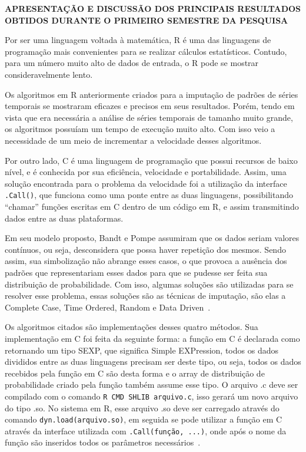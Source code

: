 \documentclass{article}
\begin{document}
\newpage
\begin{center}
\textbf{\large{APRESENTAÇÃO E DISCUSSÃO DOS PRINCIPAIS RESULTADOS OBTIDOS DURANTE O PRIMEIRO SEMESTRE DA PESQUISA}}

\hrulefill 

\end{center}
    
Por ser uma linguagem voltada à matemática, R é uma das linguagens de programação mais convenientes para se realizar cálculos estatísticos. Contudo, para um número muito alto de dados de entrada, o R pode se mostrar consideravelmente lento.


Os algoritmos em R anteriormente criados para a imputação de padrões de séries temporais se mostraram eficazes e precisos em seus resultados. Porém, tendo em vista que era necessária a análise de séries temporais de tamanho muito grande, os algoritmos possuíam um tempo de execução muito alto. Com isso veio a necessidade de um meio de incrementar a velocidade desses algoritmos.

Por outro lado, C é uma linguagem de programação que possui recursos de baixo nível, e é conhecida por sua eficiência, velocidade e portabilidade. Assim, uma solução encontrada para o problema da velocidade foi a utilização da interface \verb|.Call()|, que funciona como uma ponte entre as duas linguagens, possibilitando “chamar” funções escritas em C dentro de um código em R, e assim transmitindo dados entre as duas plataformas.

Em seu modelo proposto, Bandt e Pompe assumiram que os dados seriam valores contínuos, ou seja, desconsidera que possa haver repetição dos mesmos. Sendo assim, sua simbolização não abrange esses casos, o que provoca a ausência dos padrões que representariam esses dados para que se pudesse ser feita sua distribuição de probabilidade. Com isso, algumas soluções são utilizadas para se resolver esse problema, essas soluções são as técnicas de imputação, são elas a Complete Case, Time Ordered, Random e Data Driven~\cite{traversaro2018bandt}.

Os algoritmos citados são implementações desses quatro métodos. Sua implementação em C foi feita da seguinte forma: a função em C é declarada como retornando um tipo SEXP, que significa Simple EXPression, todos os dados divididos entre as duas linguagens precisam ser deste tipo, ou seja, todos os dados recebidos pela função em C são desta forma e o array de distribuição de probabilidade criado pela função também assume esse tipo. O arquivo .c deve ser compilado com o comando \verb|R CMD SHLIB arquivo.c|, isso gerará um novo arquivo do tipo .so. No sistema em R, esse arquivo .so deve ser carregado através do comando \verb|dyn.load(arquivo.so)|, em seguida se pode utilizar a função em C através da interface utilizada com \verb|.Call(função, ...)|, onde após o nome da função são inseridos todos os parâmetros necessários~\cite{.Call,Extensions}.
\end{document}
